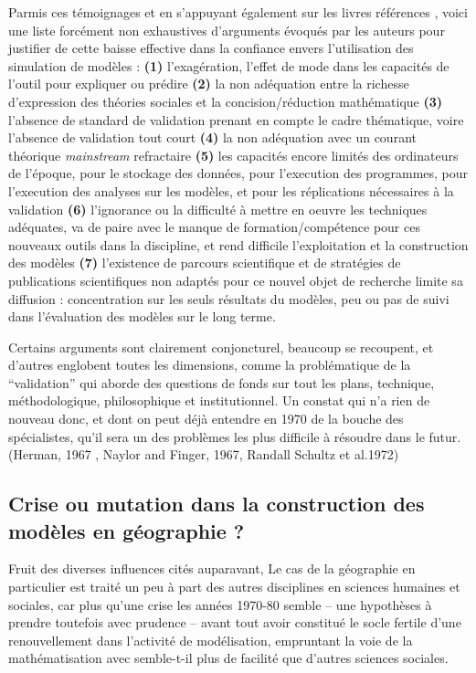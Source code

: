 Parmis ces témoignages et en s'appuyant également sur les livres références \autocite{Naylor1966,Guetzkow1972,Dutton1971}, voici une liste forcément non exhaustives d'arguments évoqués par les auteurs pour justifier de cette baisse effective dans la confiance envers l'utilisation des simulation de modèles : \textbf{(1)} l'exagération, l'effet de mode dans les capacités de l'outil pour expliquer ou prédire \textbf{(2)} la non adéquation entre la richesse d'expression des théories sociales et la concision/réduction mathématique \textbf{(3)} l'absence de standard de validation prenant en compte le cadre thématique, voire l'absence de validation tout court \textbf{(4)} la non adéquation avec un courant théorique \textit{mainstream} refractaire \textbf{(5)} les capacités encore limités des ordinateurs de l'époque, pour le stockage des données, pour l'execution des programmes, pour l'execution des analyses sur les modèles, et pour les réplications nécessaires à la validation \textbf{(6)} l'ignorance ou la difficulté à mettre en oeuvre les techniques adéquates, va de paire avec le manque de formation/compétence pour ces nouveaux outils dans la discipline, et rend difficile l'exploitation et la construction des modèles \textbf{(7)} l'existence de parcours scientifique et de stratégies de publications scientifiques non adaptés pour ce nouvel objet de recherche limite sa diffusion : concentration sur les seuls résultats du modèles, peu ou pas de suivi dans l'évaluation des modèles sur le long terme.

Certains arguments sont clairement conjoncturel, beaucoup se recoupent, et d'autres englobent toutes les dimensions, comme la problématique de la \enquote{validation} qui aborde des questions de fonds sur tout les plans, technique, méthodologique, philosophique et institutionnel. Un constat qui n'a rien de nouveau donc, et dont on peut déjà entendre en 1970 de la bouche des spécialistes, qu'il sera un des problèmes les plus difficile à résoudre dans le futur. (Herman, 1967 , Naylor and Finger, 1967, Randall Schultz et al.1972)  


\subsection{Crise ou mutation dans la construction des modèles en géographie ?}

Fruit des diverses influences cités auparavant, Le cas de la géographie en particulier est traité un peu à part des autres disciplines en sciences humaines et sociales, car plus qu'une crise les années 1970-80 semble -- une hypothèses à prendre toutefois avec prudence -- avant tout avoir constitué le socle fertile d'une renouvellement dans l'activité de modélisation, empruntant la voie de la mathématisation avec semble-t-il plus de facilité que d'autres sciences sociales.

